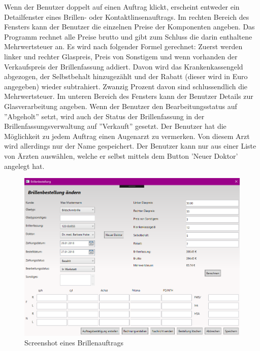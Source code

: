 \noindent Wenn der Benutzer doppelt auf einen Auftrag klickt, erscheint entweder ein Detailfenster eines Brillen- oder Kontaktlinsenauftrags. Im rechten Bereich des Fensters kann der Benutzer die einzelnen Preise der Komponenten angeben. Das Programm rechnet alle Preise  brutto und gibt zum Schluss die darin enthaltene Mehrwertsteuer an. Es wird nach folgender Formel gerechnet: \newline Zuerst werden linker und rechter Glaspreis, Preis von Sonstigem und wenn vorhanden der Verkaufspreis der Brillenfassung addiert. Davon wird das Krankenkassengeld abgezogen, der Selbstbehalt hinzugezählt und der Rabatt (dieser wird in Euro angegeben) wieder subtrahiert. Zwanzig Prozent davon sind schlussendlich die Mehrwertsteuer. \newline
Im unteren Bereich des Fensters kann der Benutzer Details zur Glasverarbeitung angeben. Wenn der Benutzer den Bearbeitungsstatus auf ''Abgeholt'' setzt, wird auch der Status der Brillenfassung in der Brillenfassungsverwaltung auf ''Verkauft'' gesetzt. \newline Der Benutzer hat die Möglichkeit zu jedem Auftrag einen Augenarzt zu vermerken. Von diesem Arzt wird allerdings nur der Name gespeichert. Der Benutzer kann nur aus einer Liste von Ärzten auswählen, welche er  selbst mittels dem Button 'Neuer Doktor' angelegt hat.
\begin{figure}[H]
\begin{center}
	\includegraphics[scale=.6]{images/Brillenauftrag.png}
\end{center}
	\caption{Screenshot eines Brillenauftrags}
	\label{fig:sample}
\end{figure}
